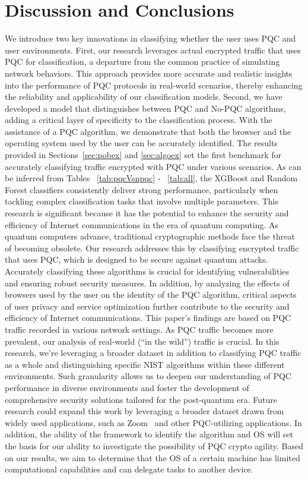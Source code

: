 \documentclass[10pt,journal]{IEEEtran}%
\begin{document}
\section{Discussion and Conclusions}
\label{sec:disc}
We introduce two key innovations in classifying whether the user uses PQC and user environments. First, our research leverages actual encrypted traffic that uses PQC for classification, a departure from the common practice of simulating network behaviors. This approach provides more accurate and realistic insights into the performance of PQC protocols in real-world scenarios, thereby enhancing the reliability and applicability of our classification models. Second, we have developed a model that distinguishes between PQC and No-PQC algorithms, adding a critical layer of specificity to the classification process. With the assistance of a PQC algorithm, we demonstrate that both the browser and the operating system used by the user can be accurately identified.
The results provided in Sections~\ref{sec:pobex} and \ref{sec:algoex} set the first benchmark for accurately classifying traffic encrypted with PQC under various scenarios. As can be inferred from Tables ~\ref{tab:pqcVsnpqc} - ~\ref{tab:all}, the XGBoost and Random Forest classifiers consistently deliver strong performance, particularly when tackling complex classification tasks that involve multiple parameters.
This research is significant because it has the potential to enhance the security and efficiency of Internet communications in the era of quantum computing. As quantum computers advance, traditional cryptographic methods face the threat of becoming obsolete. Our research addresses this by classifying encrypted traffic that uses PQC, which is designed to be secure against quantum attacks. Accurately classifying these algorithms is crucial for identifying vulnerabilities and ensuring robust security measures. In addition, by analyzing the effects of browsers used by the user on the identity of the PQC algorithm, critical aspects of user privacy and service optimization further contribute to the security and efficiency of Internet communications. This paper’s findings are based on PQC traffic recorded in various network settings. 
As PQC traffic becomes more prevalent, our analysis of real-world (“in the wild”) traffic is crucial. In this research, we're leveraging a broader dataset in addition to classifying PQC traffic as a whole and distinguishing specific NIST algorithms within these different environments. Such granularity allows us to deepen our understanding of PQC performance in diverse environments and foster the development of comprehensive security solutions tailored for the post-quantum era.
Future research could expand this work by leveraging a broader dataset drawn from widely used applications, such as Zoom~\cite{zoom2024postquantum} and other PQC-utilizing applications. In addition, the ability of the framework to identify the algorithm and OS will set the basis for our ability to investigate the possibility of PQC crypto agility. Based on our results, we aim to determine that the OS of a certain machine has limited computational capabilities and can delegate tasks to another device.
\end{document}
